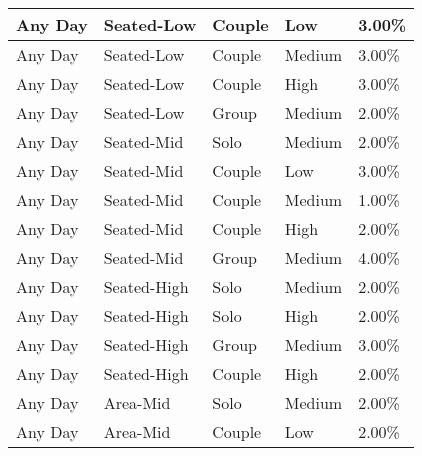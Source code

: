 \begin{longtable}{|l|l|l|l|l|}
    \hline
    Any Day                  & Seated-Low               & Couple             & Low                  & 3.00\%              \\
    \hline
    Any Day                  & Seated-Low               & Couple             & Medium               & 3.00\%              \\
    \hline
    Any Day                  & Seated-Low               & Couple             & High                 & 3.00\%              \\
    \hline
    Any Day                  & Seated-Low               & Group              & Medium               & 2.00\%              \\
    \hline
    Any Day                  & Seated-Mid               & Solo               & Medium               & 2.00\%              \\
    \hline
    Any Day                  & Seated-Mid               & Couple             & Low                  & 3.00\%              \\
    \hline
    Any Day                  & Seated-Mid               & Couple             & Medium               & 1.00\%              \\
    \hline
    Any Day                  & Seated-Mid               & Couple             & High                 & 2.00\%              \\
    \hline
    Any Day                  & Seated-Mid               & Group              & Medium               & 4.00\%              \\
    \hline
    Any Day                  & Seated-High              & Solo               & Medium               & 2.00\%              \\
    \hline
    Any Day                  & Seated-High              & Solo               & High                 & 2.00\%              \\
    \hline
    Any Day                  & Seated-High              & Group              & Medium               & 3.00\%              \\
    \hline
    Any Day                  & Seated-High              & Couple             & High                 & 2.00\%              \\
    \hline
    Any Day                  & Area-Mid                 & Solo               & Medium               & 2.00\%              \\
    \hline
    Any Day                  & Area-Mid                 & Couple             & Low                  & 2.00\%              \\

\end{longtable}
